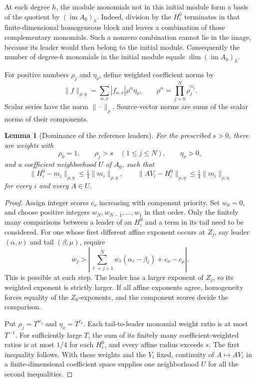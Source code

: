 \documentclass[11pt,reqno]{amsart}
\numberwithin{equation}{section}
\newtheorem{lemma}[theorem]{Lemma}
\theoremstyle{definition}
\theoremstyle{remark}
\begin{document}
At each degree \(h\), the module monomials not in this initial module
form a basis of the quotient by \((\operatorname{im}A_0)_h\).
Indeed, division by the \(H_i^0\) terminates in that finite-dimensional
homogeneous block and leaves a combination of those complementary
monomials. Such a nonzero combination cannot lie in the image,
because its leader would then belong to the initial module.
Consequently the number of degree-\(h\) monomials in the initial
module equals \(\dim(\operatorname{im}A_0)_h\).

For positive numbers \(\rho_j\) and \(\eta_\nu\), define weighted
coefficient norms by
\[
 \|f\|_{\rho,\eta}
 =
 \sum_{\alpha,\nu}|f_{\alpha,\nu}|\rho^\alpha\eta_\nu,
 \qquad
 \rho^\alpha=\prod_{j=0}^{N}\rho_j^{\alpha_j}.
 \]
Scalar series have the norm \(\|\cdot\|_\rho\). Source-vector norms
are sums of the scalar norms of their components.

\begin{lemma}[Dominance of the reference leaders]
\label{div:weights}
For the prescribed \(s>0\), there are weights with
\[
 \rho_0=1,\qquad \rho_j>s\quad(1\leq j\leq N),
 \qquad \eta_\nu>0,
\]
and a coefficient neighborhood \(U\) of \(A_0\), such that
\[
 \|H_i^0-m_i\|_{\rho,\eta}\leq\tfrac14\|m_i\|_{\rho,\eta},
 \qquad
 \|AV_i-H_i^0\|_{\rho,\eta}\leq\tfrac14\|m_i\|_{\rho,\eta}
 \tag{\(\ddagger\)}
\]
for every \(i\) and every \(A\in U\).
\end{lemma}

\begin{proof}
Assign integer scores \(c_\nu\) increasing with component priority.
Set \(w_0=0\), and choose positive integers
\(w_N,w_{N-1},\ldots,w_1\) in that order. Only the finitely many
comparisons between a leader of an \(H_i^0\) and a term in its tail
need to be considered. For one whose first different affine exponent
occurs at \(Z_j\), say leader \((\alpha,\nu)\) and tail
\((\beta,\mu)\), require
\[
 w_j>
 \left|\sum_{\ell=j+1}^{N}w_\ell(\alpha_\ell-\beta_\ell)
       +c_\nu-c_\mu\right|.
\]
This is possible at each step. The leader has a larger exponent of
\(Z_j\), so its weighted exponent is strictly larger. If all affine
exponents agree, homogeneity forces equality of the \(Z_0\)-exponents,
and the component scores decide the comparison.

Put \(\rho_j=T^{w_j}\) and \(\eta_\nu=T^{c_\nu}\).
Each tail-to-leader monomial weight ratio is at most \(T^{-1}\).
For sufficiently large \(T\), the sum of its finitely many
coefficient-weighted ratios is at most \(1/4\) for each \(H_i^0\),
and every affine radius exceeds \(s\). The first inequality follows.
With these weights and the \(V_i\) fixed, continuity of
\(A\mapsto AV_i\) in a finite-dimensional coefficient space supplies
one neighborhood \(U\) for all the second inequalities.
\end{proof}
\end{document}
